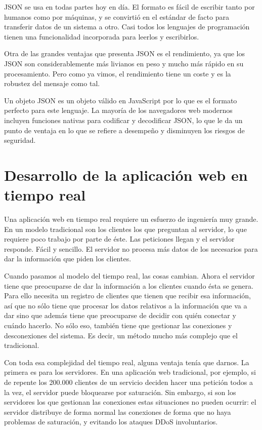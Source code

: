 JSON se usa en todas partes hoy en día. El formato es fácil de escribir tanto por humanos como por máquinas, y se convirtió en el estándar de facto para transferir datos de un sistema a otro. Casi todos los lenguajes de programación tienen una funcionalidad incorporada para leerlos y escribirlos.

Otra de las grandes ventajas que presenta JSON es el rendimiento, ya que los JSON son considerablemente más livianos en peso y mucho más rápido en su procesamiento. Pero como ya vimos, el rendimiento tiene un coste y es la robustez del mensaje como tal.

Un objeto JSON es un objeto válido en JavaScript por lo que es el formato perfecto para este lenguaje. La mayoría de los navegadores web modernos incluyen funciones nativas para codificar y decodificar JSON, lo que le da un punto de ventaja en lo que se refiere a desempeño y disminuyen los riesgos de seguridad.

\section{Desarrollo de la aplicación web en tiempo real}

Una aplicación web en tiempo real requiere un esfuerzo de ingeniería muy grande. En un modelo tradicional son los clientes los que preguntan al servidor, lo que requiere poco trabajo por parte de éste. Las peticiones llegan y el servidor responde. Fácil y sencillo. El servidor no procesa más datos de los necesarios para dar la información que piden los clientes.

Cuando pasamos al modelo del tiempo real, las cosas cambian. Ahora el servidor tiene que preocuparse de dar la información a los clientes cuando ésta se genera. Para ello necesita un registro de clientes que tienen que recibir esa información, así que no sólo tiene que procesar los datos relativos a la información que va a dar sino que además tiene que preocuparse de decidir con quién conectar y cuándo hacerlo. No sólo eso, también tiene que gestionar las conexiones y desconexiones del sistema. Es decir, un método mucho más complejo que el tradicional.

Con toda esa complejidad del tiempo real, alguna ventaja tenía que darnos. La primera es para los servidores. En una aplicación web tradicional, por ejemplo, si de repente los 200.000 clientes de un servicio deciden hacer una petición todos a la vez, el servidor puede bloquearse por saturación. Sin embargo, si son los servidores los que gestionan las conexiones estas situaciones no pueden ocurrir: el servidor distribuye de forma normal las conexiones de forma que no haya problemas de saturación, y evitando los ataques DDoS involuntarios.

